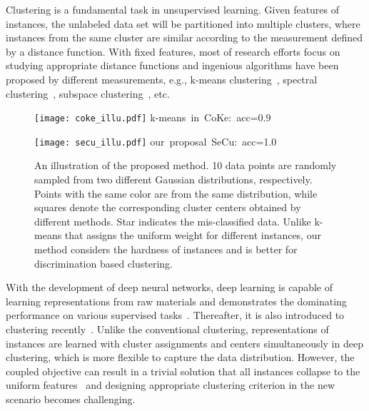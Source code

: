 \documentclass[10pt,twocolumn,letterpaper]{article}
\begin{document}
Clustering is a fundamental task in unsupervised learning. Given features of instances, the unlabeled data set will be partitioned into multiple clusters, where instances from the same cluster are similar according to the measurement defined by a distance function. With fixed features, most of research efforts focus on studying appropriate distance functions and ingenious algorithms have been proposed by different measurements, e.g., k-means clustering~\cite{Lloyd82}, spectral clustering~\cite{Luxburg07}, subspace clustering~\cite{ElhamifarV13}, etc. 


\begin{figure}[t]
\centering
\begin{minipage}{0.47\linewidth}
\centering
\texttt{[image: coke\_illu.pdf]}
\mbox{\footnotesize k-means in CoKe: acc=0.9}
\end{minipage}
\begin{minipage}{0.47\linewidth}
\centering
\texttt{[image: secu\_illu.pdf]}
\mbox{\footnotesize our proposal SeCu: acc=1.0}
\end{minipage}
\caption{An illustration of the proposed method. 10 data points are randomly sampled from two different Gaussian distributions, respectively. Points with the same color are from the same distribution, while squares denote the corresponding cluster centers obtained by different methods. Star indicates the mis-classified data. Unlike k-means that assigns the uniform weight for different instances, our method considers the hardness of instances and is better for discrimination based clustering.}\label{fig:illu}
\end{figure}


With the development of deep neural networks, deep learning is capable of learning representations from raw materials and demonstrates the dominating performance on various supervised tasks~\cite{KrizhevskySH12}. Thereafter, it is also introduced to clustering recently~\cite{CaronBJD18,DangD0WH21, GansbekeVGPG20,HuangGZ20,JiVH19,Li0LPZ021,XieGF16,YangFSH17,ZhongW0HDNL021}. Unlike the conventional clustering, representations of instances are learned with cluster assignments and centers simultaneously in deep clustering, which is more flexible to capture the data distribution. However, the coupled objective can result in a trivial solution that all instances collapse to the uniform features~\cite{CaronBJD18} and designing appropriate clustering criterion in the new scenario becomes challenging. 
\end{document}
